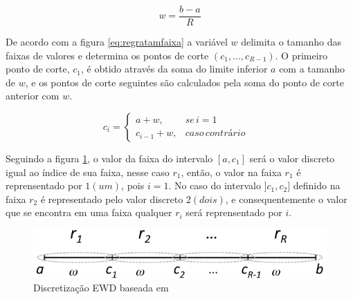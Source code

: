\begin{equation}
 w = \frac{b-a}{R}
 \label{eq:largurafaixa}
\end{equation}

De acordo com a figura \ref{eq:regratamfaixa} a variável ${w}$ delimita o tamanho das faixas de valores e determina os pontos de corte ${(c_1,...,c_{R-1})}$. O primeiro ponto de corte, ${c_1}$, é obtido através da soma do limite inferior ${a}$ com a tamanho de ${w}$, e os pontos de corte seguintes são calculados pela soma do ponto de corte anterior com ${w}$.

\begin{equation}
c_i=\left\{\begin{matrix}
a+w, & se\, i=1 & \\ 
c_{i-1}+w,  & caso\, contrário & 
\end{matrix}\right.
 \label{eq:regratamfaixa}
\end{equation}


Seguindo a figura \ref{fig:faixasEWD}, o valor da faixa do intervalo ${[a,c_1]}$ será o valor discreto igual ao índice de sua faixa, nesse caso ${r_1}$, então, o valor na faixa ${r_1}$ é reprensentado por ${1(um)}$, pois  ${i=1}$. No caso do intervalo ${]c_1,c_2]}$ definido na faixa  ${r_2}$ é representado pelo valor discreto ${2(dois)}$, e consequentemente o valor que se encontra em uma faixa qualquer ${r_i}$ será reprensentado por ${i}$.

\begin{figure}[h] 
        \centering
        \includegraphics[scale=0.6]{figs/discretizacaoEWD.png}
        \caption[Discretização EWD]{Discretização EWD baseada em \cite{LOPES2014}}%
        \label{fig:faixasEWD}
\end{figure}

